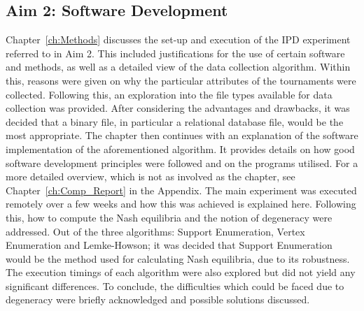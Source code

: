 \subsection{Aim 2: Software Development}\label{subsec:Aim_2_concl}
Chapter~\ref{ch:Methods} discusses the set-up and execution of the IPD experiment
referred to in Aim 2. This included justifications for the use of certain
software and methods, as well as a detailed view of the data collection
algorithm. Within this, reasons were given on why the particular attributes
of the tournaments were collected. Following this, an exploration into the
file types available for data collection was provided. After considering
the advantages and drawbacks, it was decided that a binary file, in particular a
relational database file, would be the most appropriate. The chapter then
continues with an explanation of the software implementation of
the aforementioned algorithm. It provides details on how good software
development principles were followed and on the programs utilised. For a more
detailed overview, which is not as involved as the chapter, see
Chapter~\ref{ch:Comp_Report} in the Appendix. The
main experiment was executed remotely over a few weeks and how this was
achieved is explained here. Following this, how to compute the Nash equilibria
and the notion of degeneracy were addressed. Out of the three algorithms: Support
Enumeration, Vertex Enumeration and Lemke-Howson; it was decided that Support
Enumeration would be the method used for calculating Nash equilibria, due to
its robustness. The execution timings of each algorithm were also explored but
did not yield any significant differences. To conclude, the difficulties which
could be faced due to degeneracy were briefly acknowledged and possible
solutions discussed.

